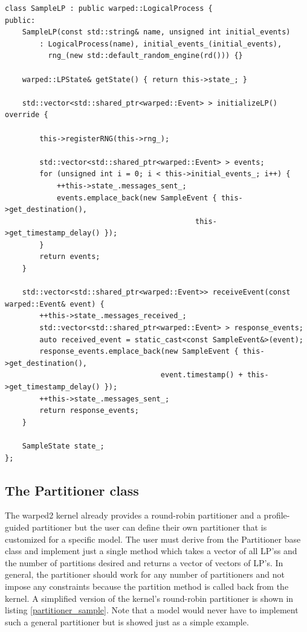 \documentclass[11pt]{book}
\begin{document}
\begin{lstlisting}[caption=Sample \textsc{warped2} LogicalProcess Definition, label=lp_sample, float]
class SampleLP : public warped::LogicalProcess {
public:
    SampleLP(const std::string& name, unsigned int initial_events)
        : LogicalProcess(name), initial_events_(initial_events),
          rng_(new std::default_random_engine(rd())) {}

    warped::LPState& getState() { return this->state_; }

    std::vector<std::shared_ptr<warped::Event> > initializeLP() override {

        this->registerRNG(this->rng_);

        std::vector<std::shared_ptr<warped::Event> > events;
        for (unsigned int i = 0; i < this->initial_events_; i++) {
            ++this->state_.messages_sent_;
            events.emplace_back(new SampleEvent { this->get_destination(),
                                            this->get_timestamp_delay() });
        }
        return events;
    }

    std::vector<std::shared_ptr<warped::Event>> receiveEvent(const warped::Event& event) {
        ++this->state_.messages_received_;
        std::vector<std::shared_ptr<warped::Event> > response_events;
        auto received_event = static_cast<const SampleEvent&>(event);
        response_events.emplace_back(new SampleEvent { this->get_destination(),
                                    event.timestamp() + this->get_timestamp_delay() });
        ++this->state_.messages_sent_;
        return response_events;
    }

    SampleState state_;
};
\end{lstlisting}

\subsection{The Partitioner class}

The warped2 kernel already provides a round-robin partitioner and a profile-guided partitioner but
the user can define their own partitioner that is customized for a specific model. The user must
derive from the Partitioner base class and implement just a single method which takes a vector of
all LP'ss and the number of partitions desired and returns a vector of vectors of LP's. In general,
the partitioner should work for any number of partitioners and not impose any constraints because
the partition method is called back from the kernel. A simplified version of the kernel's round-robin
partitioner is shown in listing \ref{partitioner_sample}. Note that a model would never have to
implement such a general partitioner but is showed just as a simple example.
\end{document}
